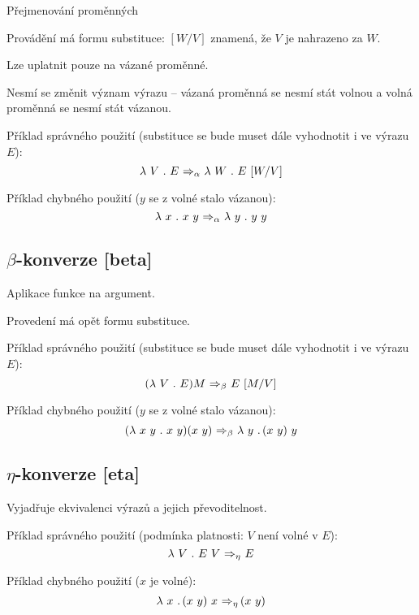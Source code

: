\begin{compactitem}
    \item Přejmenování proměnných

    \item Provádění má formu substituce: $[W/V]$ znamená, že $V$ je nahrazeno za $W$.

    \item Lze uplatnit pouze na vázané proměnné.

    \item Nesmí se změnit význam výrazu -- vázaná proměnná se nesmí stát volnou a volná proměnná se nesmí stát vázanou.

    \item Příklad správného použití (substituce se bude muset dále vyhodnotit i ve výrazu $E$):
    $$
        \operatorname{\lambda\,} V \operatorname{\,.\,} E \operatorname{\,\Rightarrow_{\alpha}\,} \operatorname{\lambda\,} W \operatorname{\,.\,} E ~ [W/V]
    $$

    \item Příklad chybného použití ($y$ se z volné stalo vázanou):
    $$
        \operatorname{\lambda\,} x \operatorname{\,.\,} x ~ y \operatorname{\,\Rightarrow_{\alpha}\,} \operatorname{\lambda\,} y \operatorname{\,.\,} y ~ y
    $$
\end{compactitem}

\subsection{$\beta$-konverze [beta]}

\begin{compactitem}
    \item Aplikace funkce na argument.

    \item Provedení má opět formu substituce.

    \item Příklad správného použití (substituce se bude muset dále vyhodnotit i ve výrazu $E$):
    $$
        ( \operatorname{\lambda\,} V \operatorname{\,.\,} E ) M \operatorname{\,\Rightarrow_{\beta}\,} E ~ [M/V]
    $$

    \item Příklad chybného použití ($y$ se z volné stalo vázanou):
    $$
        ( \operatorname{\lambda\,} x ~ y \operatorname{\,.\,} x ~ y ) ( x ~ y ) \operatorname{\,\Rightarrow_{\beta}\,} \operatorname{\lambda\,} y \operatorname{\,.\,} (x ~ y) ~ y
    $$
\end{compactitem}

\subsection{$\eta$-konverze [eta]}

\begin{compactitem}
    \item Vyjadřuje ekvivalenci výrazů a jejich převoditelnost.

    \item Příklad správného použití (podmínka platnosti: $V$ není volné v $E$):
    $$ \operatorname{\lambda\,} V \operatorname{\,.\,} E ~ V \operatorname{\,\Rightarrow_{\eta}\,} E $$

    \item Příklad chybného použití ($x$ je volné):
    $$ \operatorname{\lambda\,} x \operatorname{\,.\,} (x ~ y) ~ x \operatorname{\,\Rightarrow_{\eta}\,} (x ~ y) $$

\end{compactitem}

